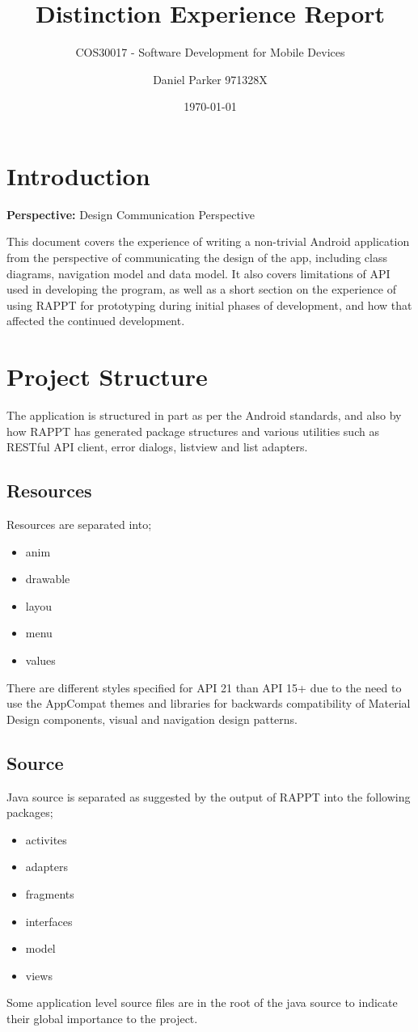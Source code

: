 \documentclass[11pt,english,numbers=endperiod,parskip=half]{scrartcl}
\title{Distinction Experience Report}
\subtitle{COS30017 - Software Development for Mobile Devices}
\author{Daniel Parker 971328X}
\date{\today}
\begin{document}
\maketitle
\thispagestyle{empty}

\section{Introduction}
  \centering
    \textbf{Perspective:} Design Communication Perspective

  \raggedright
    This document covers the experience of writing a non-trivial Android
    application from the perspective of communicating the design of the app,
    including class diagrams, navigation model and data model. It also covers
    limitations of API used in developing the program, as well as a short
    section on the experience of using RAPPT for prototyping during initial
    phases of development, and how that affected the continued development.

\section{Project Structure}
  The application is structured in part as per the Android standards, and also
  by how RAPPT has generated package structures and various utilities such as
  RESTful API client, error dialogs, listview and list adapters.

  \subsection{Resources}
    Resources are separated into;
    \begin{itemize}
      \item{anim}
      \item{drawable}
      \item{layou}
      \item{menu}
      \item{values}
    \end{itemize}
    There are different
    styles specified for API 21 than API 15+ due to the need to use the AppCompat
    themes and libraries for backwards compatibility of Material Design components,
    visual and navigation design patterns.

  \subsection{Source}
    Java source is separated as suggested by the output of RAPPT into the following
    packages;
    \begin{itemize}
      \item{activites}
      \item{adapters}
      \item{fragments}
      \item{interfaces}
      \item{model}
      \item{views}
    \end{itemize}
    Some application level source files are in the root of the java source to
    indicate their global importance to the project.
\end{document}
